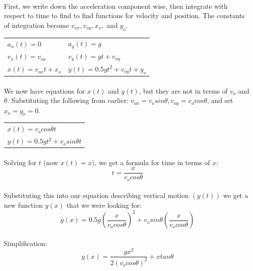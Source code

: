 \documentclass[11pt,a4paper]{report}
\begin{document}
\paragraph{}First, we write down the acceleration component wise, then integrate with respect to time to find to find functions for velocity and position. The constants of integration become $v_{ox}, v_{oy}, x_o,$ and $y_o$.
\begin{center}
\begin{tabular}{l l}
$a_x(t) = 0$ 				& $a_y(t) = g$ \\
$v_x(t) = v_{ox}$ 			& $v_y(t) = gt + v_{oy}$ \\
$x(t) = v_{ox}t + x_o$ 		& $y(t) = 0.5gt^2 + v_{oy}t + y_o$ \\
\end{tabular}
\end{center}
\paragraph{}We now have equations for $x(t)$ and $y(t)$, but they are not in terms of $v_o$ and $\theta$. Substituting the following from earlier: $v_{ox} = v_osin\theta, v_{oy} = v_ocos\theta$, and set $x_o = y_o = 0$. 
\begin{center}
\begin{tabular}{l}
$x(t) = v_ocos\theta t$ \\ $y(t) = 0.5gt^2 + v_osin\theta t$ \\
\end{tabular}
\end{center}
\paragraph{}Solving for $t$ (now $x(t) = x$), we get a formula for time in terms of $x$:
$$t = \frac{x}{v_ocos\theta}$$
\paragraph{}Substituting this into our equation describing vertical motion $(y(t))$ we get a new function $y(x)$ that we were looking for:
$$y(x) = 0.5g(\frac{x}{v_ocos\theta})^2 + v_osin\theta(\frac{x}{v_ocos\theta})$$
\paragraph{}Simplification:
$$y(x) = \frac{gx^2}{2(v_ocos\theta)^2} + xtan\theta$$
\end{document}
